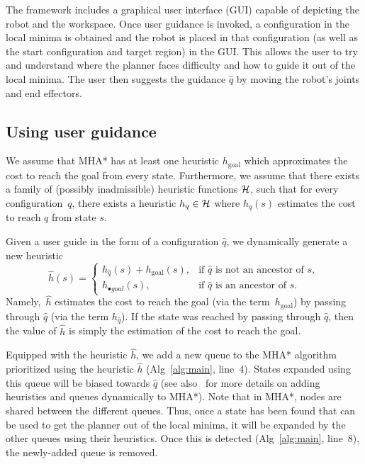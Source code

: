 \documentclass[conference]{IEEEtran}
\begin{document}
The framework includes a graphical user interface (GUI) capable of  depicting the robot and the workspace.
Once user guidance is invoked, 
a configuration in the local minima is obtained and the robot is placed in that configuration (as well as the start configuration and target region) in the GUI.
This allows the user to try and understand where the planner faces difficulty and how to guide it out of the local minima.
The user then suggests the guidance $\hat{q}$ by moving the robot's joints and end effectors.

\subsection{Using user guidance}
\label{sec:q3}
We assume that MHA* has at least one heuristic $h_{\text{goal}}$ which approximates the cost to reach the goal from every state.
Furthermore, we assume that there exists a family of (possibly inadmissible) heuristic functions $\mathcal{H}$, such that for every configuration~$q$, there exists a heuristic $h_q \in \mathcal{H}$ where $h_q(s)$ estimates the cost to reach $q$ from state $s$.

Given a user guide in the form of a configuration $\hat{q}$, we dynamically generate a new heuristic $$
    \hat{h}(s)= 
\begin{cases}
    h_{\hat{q}}(s) + h_{\text{goal}}(s),	& 
    		\text{if } \hat{q} \text{ is not an ancestor of } s,\\
    h_{\textbf{•}{goal}}(s),            		& 
    		\text{if } \hat{q} \text{ is an ancestor of } s.
\end{cases}
$$
Namely,~$\hat{h}$ estimates the 
cost to reach the goal (via the term~$h_{\text{goal}}$) by passing through $\hat{q}$ (via the term $h_{\hat{q}}$). If the state was reached by passing through $\hat{q}$, then the value of $\hat{h}$ is simply the estimation of the cost to reach the goal.


Equipped with the heuristic $\hat{h}$, we add a new queue to the MHA* algorithm prioritized using the heuristic $\hat{h}$ (Alg~\ref{alg:main}, line~4). 
States expanded using this queue will be biased towards $\hat{q}$ (see also~\cite{INL15} for more details on adding heuristics and queues dynamically to MHA*).
Note that in MHA*, nodes are shared between the different queues.
Thus, once a state has been found that can be used to get the planner out of the local minima, it will be expanded by the other queues using their heuristics.
Once this is detected (Alg~\ref{alg:main}, line~8), the newly-added queue is removed.
\end{document}
